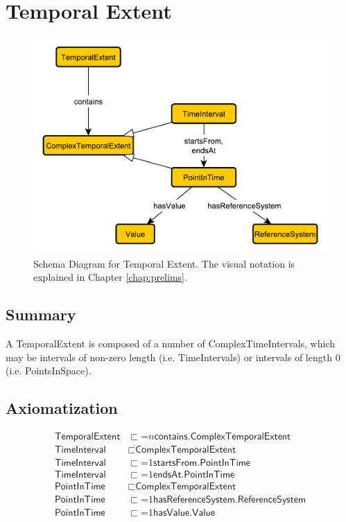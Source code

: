 \section{Temporal Extent}
\label{sec:Temporal}
\begin{figure}[h!]
\begin{center}
\includegraphics[width=.8\textwidth]{figures/temporal}
\end{center}
\caption{Schema Diagram for Temporal Extent. The visual notation is explained in Chapter \ref{chap:prelims}.}
\label{fig:Temporal}
\end{figure}
\subsection{Summary}
\label{sum:Temporal}
A \textsf{TemporalExtent} is composed of a number of \textsf{ComplexTimeIntervals}, which may be intervals of non-zero length (i.e. \textsf{TimeIntervals}) or intervals of length 0 (i.e. \textsf{PointsInSpace}).

\subsection{Axiomatization}
\label{axs:Temporal}
\begin{align}
\textsf{TemporalExtent} &\sqsubset \mathord{=}n \textsf{contains.ComplexTemporalExtent} \\
\textsf{TimeInterval} &\sqsubset \textsf{ComplexTemporalExtent} \\
\textsf{TimeInterval} &\sqsubset \mathord{=}1 \textsf{startsFrom.PointInTime} \\
\textsf{TimeInterval} &\sqsubset \mathord{=}1 \textsf{endsAt.PointInTime} \\
\textsf{PointInTime} &\sqsubset \textsf{ComplexTemporalExtent} \\
\textsf{PointInTime} &\sqsubset \mathord{=}1 \textsf{hasReferenceSystem.ReferenceSystem} \\
\textsf{PointInTime} &\sqsubset \mathord{=}1 \textsf{hasValue.Value}
\end{align}

